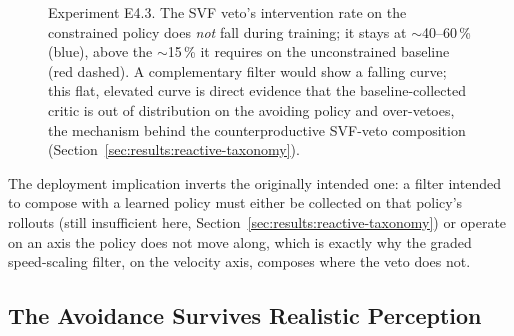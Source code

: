\documentclass[11pt,a4paper]{report}
\begin{document}
\begin{figure}[htbp]
\centering
{}
\caption{Experiment E4.3. The SVF veto's intervention rate on the
constrained policy does \emph{not} fall during training; it stays at
$\sim$40--60\,\% (blue), above the $\sim$15\,\% it requires on the
unconstrained baseline (red dashed). A complementary filter would show
a falling curve; this flat, elevated curve is direct evidence that the
baseline-collected critic is out of distribution on the avoiding
policy and over-vetoes, the mechanism behind the counterproductive
SVF-veto composition
(Section~\ref{sec:results:reactive-taxonomy}).}
\label{fig:e4.3-internalisation}
\end{figure}

The deployment implication inverts the originally intended one: a
filter intended to compose with a learned policy must either be
collected on that policy's rollouts (still insufficient here,
Section~\ref{sec:results:reactive-taxonomy}) or operate on an axis
the policy does not move along, which is exactly why the graded
speed-scaling filter, on the velocity axis, composes where the veto
does not.

\subsection{The Avoidance Survives Realistic Perception}
\label{sec:results:obs-rl}
\end{document}
